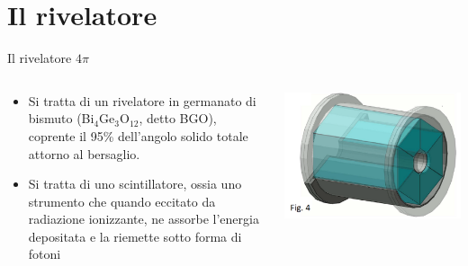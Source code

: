 \documentclass [xcolor=svgnames] {beamer}
\begin{document}
	\section{Il rivelatore}
	\begin{frame}{Il rivelatore $4\pi$}
		\begin{columns}
			\begin{column}{0.45\textwidth}
				\begin{itemize}
					\item Si tratta di un rivelatore in germanato di bismuto (Bi$_{4}$Ge$_{3}$O$_{12}$, detto BGO), coprente il 95\% dell'angolo solido totale attorno al bersaglio.
					\item Si tratta di uno scintillatore, ossia uno strumento che quando eccitato da radiazione ionizzante, ne assorbe l'energia depositata e la riemette sotto forma di fotoni
				\end{itemize}
			\end{column}
			\begin{column}{0.45\textwidth}
				\centering
				\includegraphics[width=\textwidth]{img/bgo_3d.png}
			\end{column}
		\end{columns}
		
	\end{frame}
\end{document}
